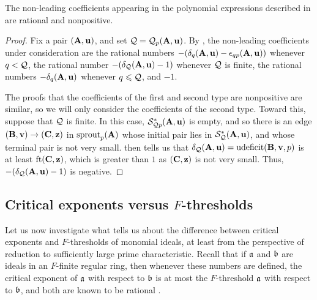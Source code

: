 \documentclass{amsart}
\begin{document}
\begin{proposition}
\label{non-leading coefficients: P}
The non-leading coefficients appearing in the polynomial expressions described in  are rational and nonpositive.
\end{proposition}

\begin{proof}
   Fix a pair $(\mathbf{A},\mathbf{u})$, and set $\mathcal{Q}=\mathcal{Q}_p(\mathbf{A},\mathbf{u})$.
   By , the non-leading coefficients under consideration are the rational numbers $-(\delta_{q}(\mathbf{A},\mathbf{u})-\epsilon_{qp}(\mathbf{A},\mathbf{u}))$ whenever $q < \mathcal{Q}$, the rational number $-(\delta_{\mathcal{Q}}(\mathbf{A},\mathbf{u}) - 1)$ whenever $\mathcal{Q}$ is finite, the rational numbers $-\delta_q(\mathbf{A},\mathbf{u})$ whenever $q\leqslant \mathcal{Q}$, and $-1$.

   The proofs that the coefficients of the first and second type are nonpositive are similar, so we will only consider the coefficients of the second type.
   Toward this, suppose that $\mathcal{Q}$ is finite.
   In this case, $\mathcal{S}^{\ast}_{\mathcal{Q} p}(\mathbf{A},\mathbf{u})$ is empty, and so there is an edge $(\mathbf{B},\mathbf{v}) \to (\mathbf{C},\mathbf{z})$ in $\operatorname{sprout}_p(\mathbf{A})$ whose initial pair lies in $\mathcal{S}^{\ast}_{\mathcal{Q}}(\mathbf{A},\mathbf{u})$, and whose terminal pair is not very small.  then tells us that $\delta_{\mathcal{Q}}(\mathbf{A},\mathbf{u}) = \operatorname{udeficit}(\mathbf{B},\mathbf{v},p)$ is at least $\operatorname{ft}(\mathbf{C}, \mathbf{z})$, which is greater than $1$ as $(\mathbf{C},\mathbf{z})$ is not very small.
   Thus, $-(\delta_{\mathcal{Q}}(\mathbf{A},\mathbf{u})-1)$ is negative.
\end{proof}

\subsection{Critical exponents versus $F$-thresholds}
\label{crit versus ft: SS}

Let us now investigate what  tells us about the difference between critical exponents and $F$-thresholds of monomial ideals, at least from the perspective of reduction to sufficiently large prime characteristic.
Recall that if $\mathfrak{a}$ and $\mathfrak{b}$ are ideals in an $F$-finite regular ring, then whenever these numbers are defined, the critical exponent of $\mathfrak{a}$ with respect to $\mathfrak{b}$ is at most the $F$-threshold $\mathfrak{a}$ with respect to $\mathfrak{b}$, and both are known to be rational \cite[Corollary~5.8]{hernandez+etal.frobenius_powers}.
\end{document}
